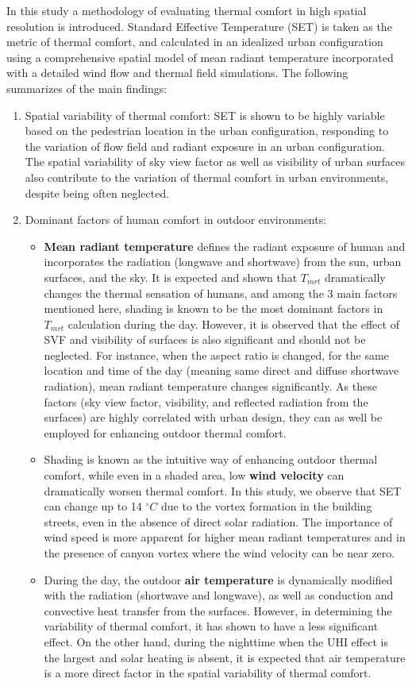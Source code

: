 \documentclass[smallextended]{svjour3}
\newcommand{\degree}{\ensuremath{^\circ}}
\begin{document}
In this study a methodology of evaluating thermal comfort in high spatial resolution is introduced. Standard Effective Temperature (SET) is taken as the metric of thermal comfort, and calculated in an idealized urban configuration using a comprehensive spatial model of mean radiant temperature incorporated with a detailed wind flow and thermal field simulations.  The following summarizes of the main findings:
\begin{enumerate}
    \item 	Spatial variability of thermal comfort: SET is shown to be highly variable based on the pedestrian location in the urban configuration, responding to the variation of flow field and radiant exposure in an urban configuration. 
    The spatial variability of sky view factor as well as visibility of urban surfaces also contribute to the variation of thermal comfort in urban environments, despite being often neglected. 
    \item 	Dominant factors of human comfort in outdoor environments: 
\begin{itemize}
\item \textbf{Mean radiant temperature} defines the radiant exposure of human and incorporates the radiation (longwave and shortwave) from the sun, urban surfaces, and the sky. 
It is expected and shown that $T_{mrt}$ dramatically changes the thermal sensation of humans, and among the 3 main factors mentioned here, shading is known to be the most dominant factors in $T_{mrt}$ calculation during the day. However, it is observed that the effect of SVF and visibility of surfaces is also significant and should not be neglected. For instance, when the aspect ratio is changed, for the same location and time of the day (meaning same direct and diffuse shortwave radiation), mean radiant temperature changes significantly. As these factors (sky view factor, visibility, and reflected radiation from the surfaces) are highly correlated with urban design, they can as well be employed for enhancing outdoor thermal comfort. 
\item Shading is known as the intuitive way of enhancing outdoor thermal comfort, while even in a shaded area, low \textbf{wind velocity} can dramatically worsen thermal comfort. In this study, we observe that SET can change up to 14 $\degree C$ due to the vortex formation in the building streets, even in the absence of direct solar radiation. The importance of wind speed is more apparent for higher mean radiant temperatures and in the presence of canyon vortex where the wind velocity can be near zero. 
\item 	During the day, the outdoor \textbf{air temperature} is dynamically modified with the radiation (shortwave and longwave), as well as conduction and convective heat transfer from the surfaces. However, in determining the variability of thermal comfort, it has shown to have a less significant effect.  On the other hand, during the nighttime when the UHI effect is the largest and solar heating is absent, it is expected that air temperature is a more direct factor in the spatial variability of thermal comfort.
\end{itemize}
\end{enumerate}
\end{document}
